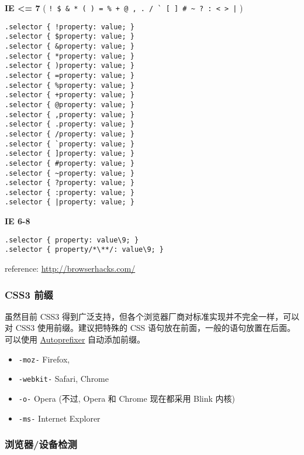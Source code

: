 \textbf{IE \textless{}= 7} (
\lstinline"! $ & * ( ) = % + @ , . / ` [ ] # ~ ? : < > |" )

\begin{lstlisting}
.selector { !property: value; }
.selector { $property: value; }
.selector { &property: value; }
.selector { *property: value; }
.selector { )property: value; }
.selector { =property: value; }
.selector { %property: value; }
.selector { +property: value; }
.selector { @property: value; }
.selector { ,property: value; }
.selector { .property: value; }
.selector { /property: value; }
.selector { `property: value; }
.selector { ]property: value; }
.selector { #property: value; }
.selector { ~property: value; }
.selector { ?property: value; }
.selector { :property: value; }
.selector { |property: value; }
\end{lstlisting}

\textbf{IE 6-8}

\begin{lstlisting}
.selector { property: value\9; }
.selector { property/*\**/: value\9; }
\end{lstlisting}

reference: \url{http://browserhacks.com/}

\subsubsection{CSS3 前缀}\label{css3-ux524dux7f00}

虽然目前 CSS3
得到广泛支持，但各个浏览器厂商对标准实现并不完全一样，可以对 CSS3
使用前缀。建议把特殊的 CSS 语句放在前面，一般的语句放置在后面。可以使用
\href{https://github.com/search?utf8=\%E2\%9C\%93\&q=Autoprefixer}{Autoprefixer}
自动添加前缀。

\begin{itemize}
\tightlist
\item
  \lstinline!-moz-! Firefox,
\item
  \lstinline!-webkit-! Safari, Chrome
\item
  \lstinline!-o-! Opera (不过, Opera 和 Chrome 现在都采用 Blink 内核)
\item
  \lstinline!-ms-! Internet Explorer
\end{itemize}

\subsubsection{浏览器/设备检测}\label{ux6d4fux89c8ux5668ux8bbeux5907ux68c0ux6d4b}

